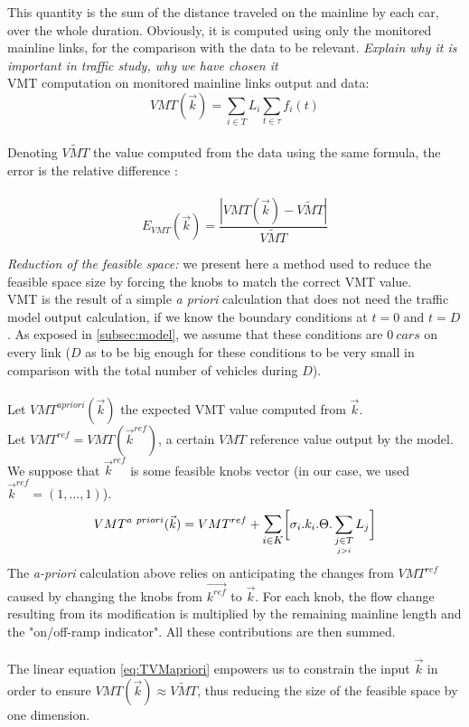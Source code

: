 This quantity is the sum of the distance traveled on the mainline by each car, over the whole duration.
Obviously, it is computed using only the monitored mainline links, for the comparison with the data to be relevant.
\emph{Explain why it is important in traffic study, why we have chosen it} 
\\
VMT computation on monitored mainline links output and data:
\begin{equation*}
	 VMT(\vec{k})=\sum_{i\in{T}}L_{i}\sum_{t\in \tau}f_{i}(t)
\end{equation*}
\\
Denoting $\widetilde{VMT}$ the value computed from the data using the same formula, the error is the relative difference :\\
\\
\begin{equation*}
	E_{VMT}(\vec{k})=\frac{|VMT(\vec{k})-\widetilde{VMT}|}{\widetilde{VMT}}
\end{equation*}

\emph{Reduction of the feasible space:} we present here a method used to reduce the feasible space size by forcing the knobs to match the correct VMT value.\\
VMT is the result of a simple \emph{a priori} calculation that does not need the traffic model output calculation, if we know the boundary conditions at $t=0$ and $t=D$. As exposed in \ref{subsec:model}, we assume that these conditions are $0\ cars$ on every link ($D$ as to be big enough for these conditions to be very small in comparison with the total number of vehicles during $D$).\\
\\
Let $VMT^{a priori}(\vec{k})$ the expected VMT value computed from $\vec{k}$.\\
Let $VMT^{ref}=VMT(\vec{k}^{ref})$, a certain $VMT$ reference value output by the model. We suppose that $\vec{k}^{ref}$ is some feasible knobs vector (in our case, we used $\vec{k}^{ref}=(1,...,1)$).\\
\begin{equation}
	\label{eq:TVMapriori}
	VMT^{a\ priori}(\vec{k})=VMT^{ref}+\mathlarger{\sum\limits_{i\in K}}\biggl[\sigma_{i}.k_{i}.\Theta.	\sum\limits_{\underset{j>i}{j\in T}}L_{j}\biggr]
\end{equation}	
The \emph{a-priori} calculation above relies on anticipating the changes from $VMT^{ref}$ caused by changing the knobs from $\vec{k^{ref}}$ to $\vec{k}$. For each knob, the flow change resulting from its modification is multiplied by the remaining mainline length and the "on/off-ramp indicator". All these contributions are then summed.\\
\\
The linear equation \ref{eq:TVMapriori} empowers us to constrain the input $\vec{k}$ in order to ensure $VMT(\vec{k})\approx \widetilde{VMT}$, thus reducing the size of the feasible space by one dimension.\\